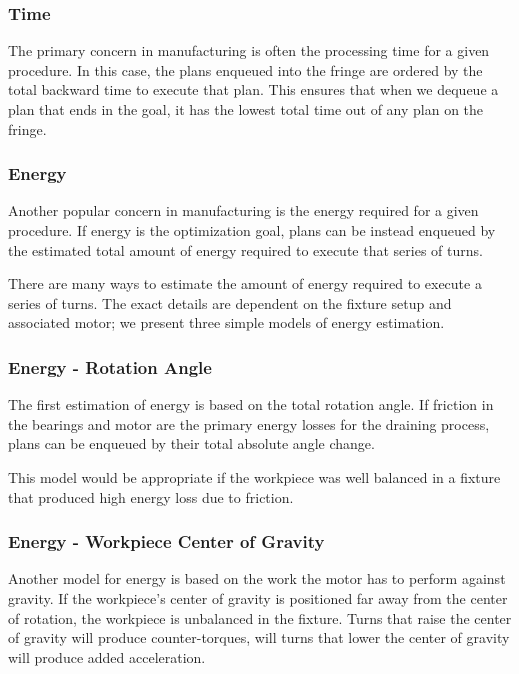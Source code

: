 		\subsubsection{Time}

The primary concern in manufacturing is often the processing time for a given procedure. In this case, the plans enqueued into the fringe are ordered by the total backward time to execute that plan. This ensures that when we dequeue a plan that ends in the goal, it has the lowest total time out of any plan on the fringe.

		\subsubsection{Energy}

Another popular concern in manufacturing is the energy required for a given procedure. If energy is the optimization goal, plans can be instead enqueued by the estimated total amount of energy required to execute that series of turns.


There are many ways to estimate the amount of energy required to execute a series of turns. The exact details are dependent on the fixture setup and associated motor; we present three simple models of energy estimation.

		\subsubsection{Energy - Rotation Angle}

The first estimation of energy is based on the total rotation angle. If friction in the bearings and motor are the primary energy losses for the draining process, plans can be enqueued by their total absolute angle change.

This model would be appropriate if the workpiece was well balanced in a fixture that produced high energy loss due to friction.

		\subsubsection{Energy - Workpiece Center of Gravity}

Another model for energy is based on the work the motor has to perform against gravity. If the workpiece's center of gravity is positioned far away from the center of rotation, the workpiece is unbalanced in the fixture. Turns that raise the center of gravity will produce counter-torques, will turns that lower the center of gravity will produce added acceleration.

